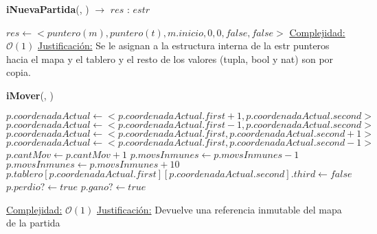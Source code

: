 \documentclass[10pt, a4paper]{article}
\begin{document}
\begin{Algoritmos}
    
    \begin{algorithm}{\textbf{iNuevaPartida}(, ) $\to$ $res$ : $estr$}
        \begin{algorithmic}
            \State $res \gets <puntero(m), puntero(t), m.inicio, 0, 0, false, false>$
            \Statex \underline{Complejidad:} $\mathcal{O}(1)$
            \Statex \underline{Justificación:} Se le asignan a la estructura interna de la estr punteros hacia el mapa y el tablero y el resto de los valores (tupla, bool y nat) son por copia.
        \end{algorithmic}
    \end{algorithm}
    
    \begin{algorithm}{\textbf{iMover}(, )}
        \begin{algorithmic}
                    \State $p.coordenadaActual \gets <p.coordenadaActual.first + 1, p.coordenadaActual.second>$
                \Else
                        \State $p.coordenadaActual \gets <p.coordenadaActual.first - 1, p.coordenadaActual.second>$
                    \Else
                            \State $p.coordenadaActual \gets <p.coordenadaActual.first, p.coordenadaActual.second + 1>$
                        \Else
                            \State $p.coordenadaActual \gets <p.coordenadaActual.first, p.coordenadaActual.second - 1>$
            \EndIf
            \State $p.cantMov \gets p.cantMov + 1$
                \State $p.movsInmunes \gets p.movsInmunes - 1$
            \EndIf
                \State $p.movsInmunes \gets p.movsInmunes + 10$
                \State $p.tablero[p.coordenadaActual.first][p.coordenadaActual.second].third \gets false$
            \EndIf
                \State $p.perdio? \gets true$
            \Else
                    \State $p.gano? \gets true$
            \EndIf
            
            \Statex \underline{Complejidad:} $\mathcal{O}(1)$
            \Statex \underline{Justificación:} Devuelve una referencia inmutable del mapa de la partida
        \end{algorithmic}
    \end{algorithm}
    

\end{Algoritmos}
\end{document}
